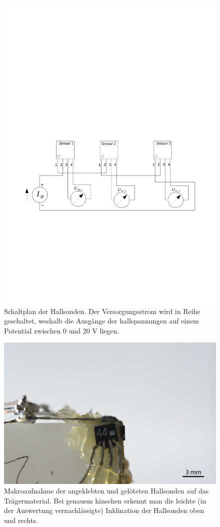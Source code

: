 \documentclass[12pt,a4paper]{article}
\begin{document}
\begin{figure}
	\centering
	\includegraphics[scale=0.8]{Hall-Sensoren-Schaltung.pdf}
	\caption{Schaltplan der Hallsonden. Der Versorgungsstrom wird in Reihe geschaltet, weshalb die Ausgänge der hallspannungen auf einem Potential zwischen 0 und 20 V liegen.}
	\label{sch-sond}
\end{figure}
\begin{figure}
	\centering
	\includegraphics[scale=0.2]{sensor.jpg}
	\caption{Makroaufnahme der angeklebten und gelöteten Hallsonden auf das Trägermaterial. Bei genauem hinsehen erkennt man die leichte (in der Auswertung vernachlässigte) Inklination der Hallsonden oben und rechts.}
	\label{sond-foto}
\end{figure}
\end{document}
